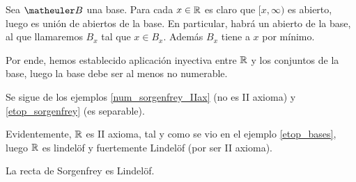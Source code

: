 \begin{exa}[$(\R,\T_{[,)})$ no es II axioma]
	\label{num_sorgenfrey_IIax}
	Sea $\B$ una base. Para cada $x\in\mathbb{R}$ es claro que $[x,\infty)$ es abierto, luego es unión de abiertos de la base. En particular, habrá un abierto de la base, al que llamaremos $B_x$ tal que $x\in B_x$. Además $B_x$ tiene a $x$ por mínimo.
	
	Por ende, hemos establecido aplicación inyectiva entre $\mathbb{R}$ y los conjuntos de la base, luego la base debe ser al menos no numerable.
\end{exa}
\begin{obs}
	Se sigue de los ejemplos \ref{num_sorgenfrey_IIax} (no es II axioma) y \ref{etop_sorgenfrey} (es separable).
\end{obs}
\begin{obs}
	\label{num_exa_lindelof_R}
	Evidentemente, $\mathbb{R}$ es II axioma, tal y como se vio en el ejemplo \ref{etop_bases}, luego $\mathbb{R}$ es lindelöf y fuertemente Lindelöf (por ser II axioma).
\end{obs}
\begin{theo}
	La recta de Sorgenfrey es Lindelöf.
\end{theo}
